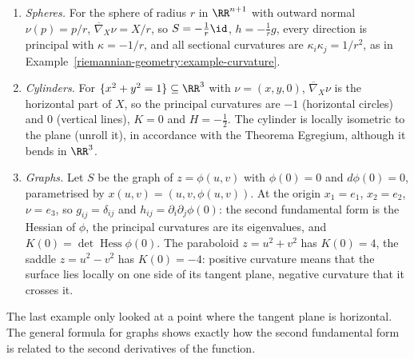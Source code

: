 \begin{example}\label{riemannian-geometry:example-surfaces}
\begin{enumerate}
\item \emph{Spheres.} For the sphere of radius $r$ in $\RR^{n+1}$ with outward normal $\nu(p) = p/r$, $\overline{\nabla}_X\nu = X/r$, so $S = -\frac1r\id$, $h = -\frac1rg$, every
direction is principal with $\kappa = -1/r$, and all sectional curvatures are $\kappa_i\kappa_j = 1/r^2$, as in Example~\ref{riemannian-geometry:example-curvature}.
\item \emph{Cylinders.} For $\{x^2 + y^2 = 1\} \subseteq \RR^3$ with $\nu = (x, y, 0)$, $\overline{\nabla}_X\nu$ is the horizontal part of $X$, so the principal curvatures are
$-1$ (horizontal circles) and $0$ (vertical lines), $K = 0$ and $H = -\frac12$. The cylinder is locally isometric to the plane (unroll it), in accordance with the Theorema
Egregium, although it bends in $\RR^3$.
\item \emph{Graphs.} Let $S$ be the graph of $z = \phi(u, v)$ with $\phi(0) = 0$ and $d\phi(0) = 0$, parametrised by $x(u, v) = (u, v, \phi(u, v))$. At the origin
$x_1 = e_1$, $x_2 = e_2$, $\nu = e_3$, so $g_{ij} = \delta_{ij}$ and $h_{ij} = \partial_i\partial_j\phi(0)$: the second fundamental form is the Hessian of $\phi$, the principal
curvatures are its eigenvalues, and $K(0) = \det\operatorname{Hess}\phi(0)$. The paraboloid $z = u^2 + v^2$ has $K(0) = 4$, the saddle $z = u^2 - v^2$ has $K(0) = -4$: positive
curvature means that the surface lies locally on one side of its tangent plane, negative curvature that it crosses it.
\end{enumerate}
\end{example}

The last example only looked at a point where the tangent plane is horizontal. The general formula for graphs shows exactly how the second fundamental form is related to the second derivatives of
the function.

